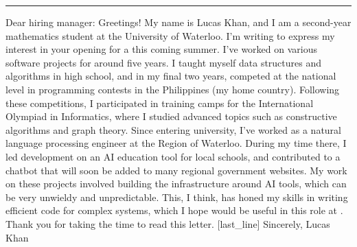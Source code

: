 \documentclass[12pt]{article}
\newcommand{\companyname}{}
\newcommand{\position}{}
\begin{document}
\begin{minipage}[t]{0.63\textwidth}
  \vspace{0pt}
  \rule{\linewidth}{3px} %
  \newline \newline
  Dear hiring manager:
  \newline \newline
  Greetings! My name is Lucas Khan, and I am a second-year mathematics student at the University of Waterloo. I’m writing to express my interest in your opening for a \position this coming summer.
  \newline \newline
  I’ve worked on various software projects for around five years. I taught myself data structures and algorithms in high school, and in my final two years, competed at the national level in programming contests in the Philippines (my home country). Following these competitions, I participated in training camps for the International Olympiad in Informatics, where I studied advanced topics such as constructive algorithms and graph theory.
  \newline \newline
  Since entering university, I’ve worked as a natural language processing engineer at the Region of Waterloo. During my time there, I led development on an AI education tool for local schools, and contributed to a chatbot that will soon be added to many regional government websites. My work on these projects involved building the infrastructure around AI tools, which can be very unwieldy and unpredictable. This, I think, has honed my skills in writing efficient code for complex systems, which I hope would be useful in this role at \companyname.
  \newline \newline
  Thank you for taking the time to read this letter. [last_line]
  \newline \newline
  Sincerely,
  \newline \newline \newline
  Lucas Khan
\end{minipage}
\end{document}
